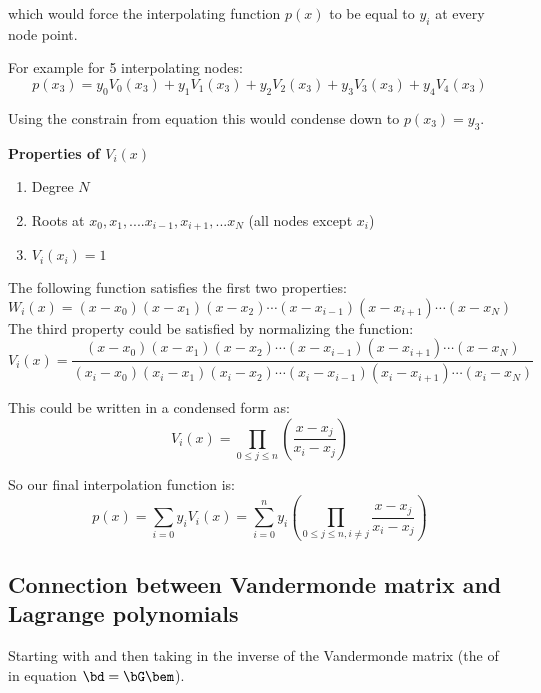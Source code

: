 \documentclass[11pt,titlepage,fleqn]{article}
\begin{document}
which would force the interpolating function $p(x)$ to be equal to $y_i$ at every node point.

For example for 5 interpolating nodes:
\begin{equation}
p(x_3) = y_0V_0(x_3) + y_1V_1(x_3) + y_2V_2(x_3) + y_3V_3(x_3) + y_4V_4(x_3)
\end{equation}

Using the constrain from equation  this would condense down to $p(x_3) = y_3$.
\linebreak

{\bf Properties of $V_i(x)$}
\begin{enumerate}
\item Degree $N$
\item Roots at $x_0, x_1,....x_{i-1}, x_{i+1},...x_N$ (all nodes except $x_i$)
\item $V_i(x_i) = 1$
\end{enumerate}

The following function satisfies the first two properties:
\begin{equation}
W_i(x) = (x-x_0) (x-x_1)(x-x_2) \cdots (x-x_{i-1})(x-x_{i+1})\cdots(x-x_N)
\end{equation}
The third property could be satisfied by normalizing the function:
\begin{equation}
V_i(x) = \frac{(x-x_0) (x-x_1)(x-x_2) \cdots (x-x_{i-1})(x-x_{i+1})\cdots(x-x_N)}{(x_i-x_0) (x_i-x_1)(x_i-x_2) \cdots (x_i-x_{i-1})(x_i-x_{i+1})\cdots(x_i-x_N)}
\end{equation}

This could be written in a condensed form as:
\begin{equation}
V_i(x) = \prod_{0\leq j\leq n} \left (\frac{x-x_j}{x_i -x _j} \right )
\end{equation}

So our final interpolation function is:
\begin{equation}
p(x) = \sum_{i=0} y_i V_i(x) = \sum_{i=0}^n y_i \left (\prod_{0\leq j\leq n, i\neq j} \frac{x-x_j}{x_i -x _j} \right )
\end{equation}

\subsection{Connection between Vandermonde matrix and Lagrange polynomials}

Starting with  and then taking in the inverse of the Vandermonde matrix (the \bG of in equation $\bd = \bG \bem$).
\end{document}
